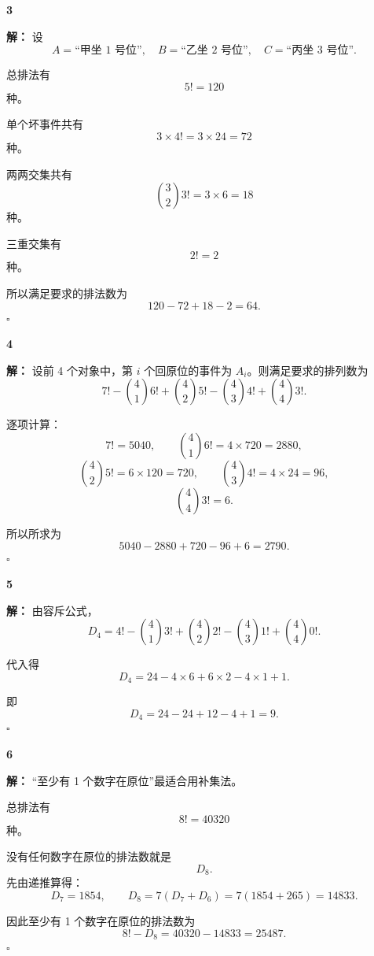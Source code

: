 \documentclass[11pt,a4paper,fontset=fandol]{ctexart}
\theoremstyle{formaltheorem}
\theoremstyle{formalexample}
\newenvironment{solution}{\par\noindent\textbf{解：}}{\hfill$\square$\par}
\begin{document}
\textbf{3}\begin{solution}
设
\[
A=\text{“甲坐 1 号位”},\quad B=\text{“乙坐 2 号位”},\quad C=\text{“丙坐 3 号位”}.
\]

总排法有
\[
5!=120
\]
种。

单个坏事件共有
\[
3\times 4!=3\times 24=72
\]
种。

两两交集共有
\[
\binom32 3!=3\times 6=18
\]
种。

三重交集有
\[
2!=2
\]
种。

所以满足要求的排法数为
\[
120-72+18-2=64.
\]
\end{solution}

\textbf{4}\begin{solution}
设前 4 个对象中，第 $i$ 个回原位的事件为 $A_i$。则满足要求的排列数为
\[
7!-\binom41 6!+\binom42 5!-\binom43 4!+\binom44 3!.
\]

逐项计算：
\[
7!=5040,
\qquad
\binom41 6!=4\times 720=2880,
\]
\[
\binom42 5!=6\times 120=720,
\qquad
\binom43 4!=4\times 24=96,
\]
\[
\binom44 3!=6.
\]

所以所求为
\[
5040-2880+720-96+6=2790.
\]
\end{solution}

\textbf{5}\begin{solution}
由容斥公式，
\[
D_4=4!-\binom41 3!+\binom42 2!-\binom43 1!+\binom44 0!.
\]

代入得
\[
D_4=24-4\times 6+6\times 2-4\times 1+1.
\]

即
\[
D_4=24-24+12-4+1=9.
\]
\end{solution}

\textbf{6}\begin{solution}
“至少有 1 个数字在原位”最适合用补集法。

总排法有
\[
8!=40320
\]
种。

没有任何数字在原位的排法数就是
\[
D_8.
\]
先由递推算得：
\[
D_7=1854,
\qquad
D_8=7(D_7+D_6)=7(1854+265)=14833.
\]

因此至少有 1 个数字在原位的排法数为
\[
8!-D_8=40320-14833=25487.
\]
\end{solution}
\end{document}
